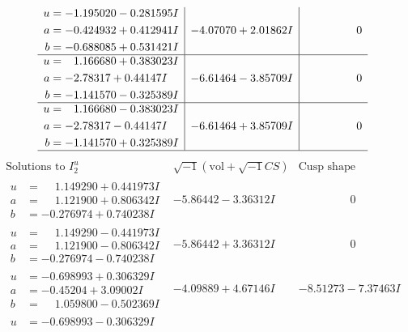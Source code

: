 \documentclass[1p]{elsarticle_modified}
\theoremstyle{definition}
\newcommand{\I}{\sqrt{-1}}
\begin{document}
$$\begin{array}{c|c|c}
\begin{aligned}
u &= -1.195020 - 0.281595 I \\
a &= -0.424932 + 0.412941 I \\
b &= -0.688085 + 0.531421 I\end{aligned}
 & -4.07070 + 2.01862 I & \phantom{-0.000000 } 0 \\ \hline\begin{aligned}
u &= \phantom{-}1.166680 + 0.383023 I \\
a &= -2.78317 + 0.44147 I \\
b &= -1.141570 - 0.325389 I\end{aligned}
 & -6.61464 - 3.85709 I & \phantom{-0.000000 } 0 \\ \hline\begin{aligned}
u &= \phantom{-}1.166680 - 0.383023 I \\
a &= -2.78317 - 0.44147 I \\
b &= -1.141570 + 0.325389 I\end{aligned}
 & -6.61464 + 3.85709 I & \phantom{-0.000000 } 0\\
 \hline 
 \end{array}$$\newpage$$\begin{array}{c|c|c}  
\text{Solutions to }I^u_{2}& \I (\text{vol} + \sqrt{-1}CS) & \text{Cusp shape}\\
 \hline 
\begin{aligned}
u &= \phantom{-}1.149290 + 0.441973 I \\
a &= \phantom{-}1.121900 + 0.806342 I \\
b &= -0.276974 + 0.740238 I\end{aligned}
 & -5.86442 - 3.36312 I & \phantom{-0.000000 } 0 \\ \hline\begin{aligned}
u &= \phantom{-}1.149290 - 0.441973 I \\
a &= \phantom{-}1.121900 - 0.806342 I \\
b &= -0.276974 - 0.740238 I\end{aligned}
 & -5.86442 + 3.36312 I & \phantom{-0.000000 } 0 \\ \hline\begin{aligned}
u &= -0.698993 + 0.306329 I \\
a &= -0.45204 + 3.09002 I \\
b &= \phantom{-}1.059800 - 0.502369 I\end{aligned}
 & -4.09889 + 4.67146 I & -8.51273 - 7.37463 I \\ \hline\begin{aligned}
u &= -0.698993 - 0.306329 I \\

\end{aligned}
\end{array}$$
\end{document}
